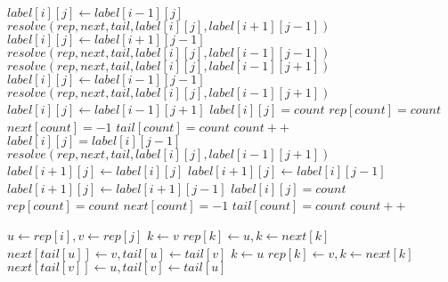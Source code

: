 \begin{algorithm*}

\begin{algorithmic}
						\State $label[i][j] \gets label[i-1][j]$
							\State $resolve(rep,next,tail,label[i][j],label[i+1][j-1])$
						\EndIf
					\Else
							\State $label[i][j] \gets label[i+1][j-1]$
								\State $resolve(rep,next,tail,label[i][j],label[i-1][j-1])$
							\EndIf
								\State $resolve(rep,next,tail,label[i][j],label[i-1][j+1])$
							\EndIf
						\Else
								\State $label[i][j] \gets label[i-1][j-1]$
									\State $resolve(rep,next,tail,label[i][j],label[i-1][j+1])$
								\EndIf
							\Else
									\State $label[i][j] \gets label[i-1][j+1]$
								\Else
									\State $label[i][j] = count$
									\State $rep[count] = count$
									\State $next[count] = -1$
									\State $tail[count] = count$
									\State $count++$	
								\EndIf
							\EndIf
						\EndIf
					\EndIf
				\Else
					\State $label[i][j] = label[i][j-1]$
							\State $resolve(rep,next,tail,label[i][j],label[i-1][j+1])$
						\EndIf
					\EndIf
				\EndIf
					\State $label[i+1][j] \gets label[i][j]$
				\EndIf
			\Else
						\State $label[i+1][j] \gets label[i][j-1]$
					\Else
							\State $label[i+1][j] \gets label[i+1][j-1]$
						\Else
							\State $label[i][j] = count$
							\State $rep[count] = count$
							\State $next[count] = -1$
							\State $tail[count] = count$
							\State $count++$
						\EndIf
					\EndIf
				\EndIf
			\EndIf
		\EndFor
	\EndFor
\EndFunction
\end{algorithmic}	
\end{algorithm*}


 \begin{algorithm*}
 \begin{algorithmic}
 	\State $u \gets rep[i], v \gets rep[j]$
 	\If{$u < v$}
 		\State $k \gets v$
 		\While{$k \neq -1$}
 			\State $rep[k] \gets u, k \gets next[k]$
 		\EndWhile
 		\State $next[tail[u]] \gets v, tail[u] \gets tail[v]$
 	\ElsIf{$u > v$}
 		\State $k \gets u$
 		\While{$k \neq -1$}
 			\State $rep[k] \gets v, k \gets next[k]$
 		\EndWhile
 		\State $next[tail[v]] \gets u, tail[v] \gets tail[u]$
 	\EndIf
 \EndFunction
 \end{algorithmic}
 \end{algorithm*}
